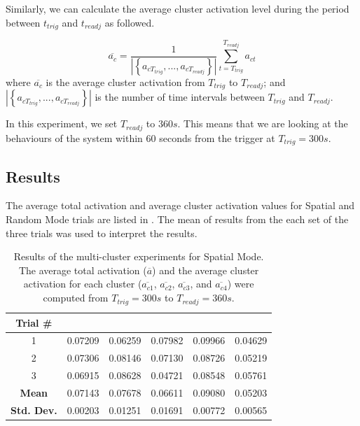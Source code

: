 Similarly, we can calculate the average cluster activation level during the period between $t_{trig}$ and $t_{readj}$ as followed.

\begin{equation}\label{eqn:average_cluster_activation}
\overline{a_c} = \frac{1}{| \left\{ a_{cT_{trig}}, ... , a_{cT_{readj}} \right\}|} \sum_{t=T_{trig}}^{T_{readj}} a_{ct}
\end{equation}
where $\overline{a_c}$ is the average cluster activation from $T_{trig}$ to $T_{readj}$; and $| \left\{ a_{cT_{trig}}, ..., a_{cT_{readj}} \right\}|$ is the number of time intervals between $T_{trig}$ and $T_{readj}$.

In this experiment, we set  $T_{readj}$ to $360s$. This means that we are looking at the behaviours of the system within 60 seconds from the trigger at $T_{trig} = 300s$.

\subsection{Results}

The average total activation and average cluster activation values for Spatial and Random Mode trials are listed in . The mean of results from the each set of the three trials was used to interpret the results. 

\begin{table}[!htbp]
	\caption[Results of the multi-cluster experiment for Spatial Mode]{Results of the multi-cluster experiments for Spatial Mode. The average total activation ($\overline{a}$) and the average cluster activation for each cluster ($\overline{a_{c1}}$, $\overline{a_{c2}}$, $\overline{a_{c3}}$, and $\overline{a_{c4}}$) were computed from $T_{trig} = 300s$ to  $T_{readj} = 360s $.}
	\begin{center}
		\begin{tabular}{ | c | c | c | c | c | c |} 
			\hline
			\textbf{Trial \#} & \boldmath{$\overline{a}$}  & \boldmath{$\overline{a_{c1}}$}  & \boldmath{$\overline{a_{c2}}$} & \boldmath{$\overline{a_{c3}}$} & \boldmath{$\overline{a_{c4}}$} \\ 
			\hline
			\hline
			1 & 0.07209 & 0.06259 & 0.07982 & 0.09966 & 0.04629 \\
			\hline
			2 & 0.07306 & 0.08146 & 0.07130 & 0.08726 & 0.05219 \\
			\hline
			3 & 0.06915 & 0.08628 & 0.04721 & 0.08548 & 0.05761 \\
			\hlineB{3}	
			\textbf{Mean} & 0.07143	 & 0.07678 & 0.06611 & 0.09080 & 0.05203 \\
			\hline
			\textbf{Std. Dev.} & 0.00203 & 0.01251 & 0.01691 & 0.00772 & 0.00565 \\
			\hline			
		\end{tabular}
	\end{center}
	\label{table:multi-cluster-results-spatial}
\end{table}

